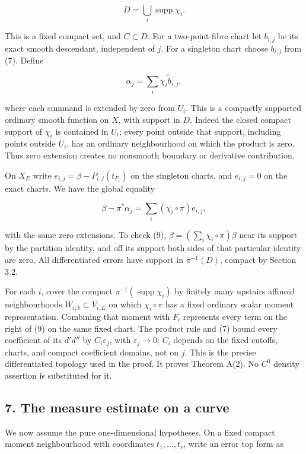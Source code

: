 \documentclass[
  11pt,
]{article}
\begin{document}
\[D=\bigcup_i\operatorname{supp}\chi_i.\]

This is a fixed compact set, and \(C\subset D\). For a two-point-fibre
chart let \(b_{i,j}\) be its exact smooth descendant, independent of
\(j\). For a singleton chart choose \(b_{i,j}\) from (7). Define

\[\alpha_j=\sum_i \widetilde{\chi_i b_{i,j}}, \tag{8}\]

where each summand is extended by zero from \(U_i\). This is a compactly
supported ordinary smooth function on \(X\), with support in \(D\).
Indeed the closed compact support of \(\chi_i\) is contained in \(U_i\);
every point outside that support, including points outside \(U_i\), has
an ordinary neighbourhood on which the product is zero. Thus zero
extension creates no nonsmooth boundary or derivative contribution.

On \(X_E\) write \(e_{i,j}=\beta-P_{i,j}(t_{F_i})\) on the singleton
charts, and \(e_{i,j}=0\) on the exact charts. We have the global
equality

\[
\beta-\pi^*\alpha_j=\sum_i (\chi_i\circ\pi)e_{i,j}, \tag{9}
\]

with the same zero extensions. To check (9),
\(\beta=(\sum_i\chi_i\circ\pi)\beta\) near its support by the partition
identity, and off its support both sides of that particular identity are
zero. All differentiated errors have support in \(\pi^{-1}(D)\), compact
by Section 3.2.

For each \(i\), cover the compact
\(\pi^{-1}(\operatorname{supp}\chi_i)\) by finitely many upstairs
affinoid neighbourhoods \(W_{i,k}\subset V_{i,E}\) on which
\(\chi_i\circ\pi\) has a fixed ordinary scalar moment representation.
Combining that moment with \(F_i\) represents every term on the right of
(9) on the same fixed chart. The product rule and (7) bound every
coefficient of its \(d'd''\) by \(C_i\varepsilon_j\), with
\(\varepsilon_j\to0\); \(C_i\) depends on the fixed cutoffs, charts, and
compact coefficient domains, not on \(j\). This is the precise
differentiated topology used in the proof. It proves Theorem A(2). No
\(C^0\) density assertion is substituted for it.

\subsection{7. The measure estimate on a
curve}\label{the-measure-estimate-on-a-curve}

We now assume the pure one-dimensional hypotheses. On a fixed compact
moment neighbourhood with coordinates \(t_1,\ldots,t_r\), write an error
top form as
\end{document}
